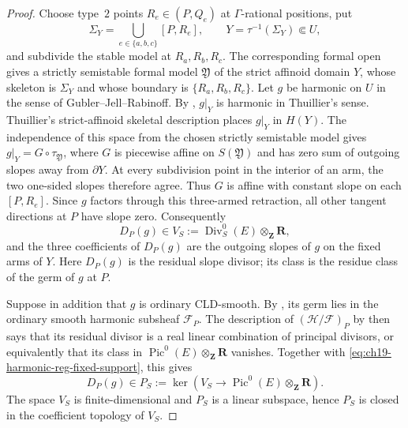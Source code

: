 \begin{proof}
Choose type~$2$ points $R_e\in(P,Q_e)$ at $\Gamma$-rational positions, put
\[
              \Sigma_Y=\bigcup_{e\in\{a,b,c\}}[P,R_e],
              \qquad Y=\tau^{-1}(\Sigma_Y)\Subset U,
\]
and subdivide the stable model at $R_a,R_b,R_c$.  The corresponding formal
open gives a strictly semistable formal model $\mathfrak Y$ of the strict
affinoid domain $Y$, whose skeleton is $\Sigma_Y$ and whose boundary is
$\{R_a,R_b,R_c\}$.  Let $g$ be harmonic on $U$ in the sense of
Gubler--Jell--Rabinoff.  By \cite[Proposition~15.7]{GJR26}, $g|_Y$ is
harmonic in Thuillier's sense.  Thuillier's strict-affinoid skeletal
description \cite[Definitions~2.3.1, 2.3.12, and 2.3.16]{Thu05} places
$g|_Y$ in $H(Y)$.  The independence of this space from the chosen strictly
semistable model \cite[Proposition~2.3.3]{Thu05} gives
$g|_Y=G\circ\tau_{\mathfrak Y}$, where $G$ is piecewise affine on
$S(\mathfrak Y)$ and has zero sum of outgoing slopes away from $\partial Y$.
At every subdivision point in the interior of an arm, the two one-sided
slopes therefore agree.  Thus $G$ is affine with constant slope on each
$[P,R_e]$.  Since $g$ factors through this three-armed retraction, all other
tangent directions at $P$ have slope zero.  Consequently
\begin{equation}
\label{eq:ch19-harmonic-reg-fixed-support}
       D_P(g)\in
       V_S:=\operatorname{Div}^0_S(E)\otimes_{\mathbf Z}\mathbf R,
\end{equation}
and the three coefficients of $D_P(g)$ are the outgoing slopes of $g$ on the
fixed arms of $Y$.  Here $D_P(g)$ is the residual slope divisor; its class is
the residue class of the germ of $g$ at $P$.

Suppose in addition that $g$ is ordinary CLD-smooth.  By
\cite[Remark~15.10]{GJR26}, its germ lies in the ordinary smooth harmonic
subsheaf $\mathcal F_P$.  The description of
$(\mathcal H/\mathcal F)_P$ by \cite[Lemma~2.3.22]{Thu05} then says that its
residual divisor is a real linear combination of principal divisors, or
equivalently that its class in
$\operatorname{Pic}^0(E)\otimes_{\mathbf Z}\mathbf R$ vanishes.  Together
with \eqref{eq:ch19-harmonic-reg-fixed-support}, this gives
\begin{equation}
\label{eq:ch19-harmonic-reg-picard-kernel}
 D_P(g)\in
 P_S:=\ker\!\left(
 V_S\longrightarrow\operatorname{Pic}^0(E)\otimes_{\mathbf Z}\mathbf R
 \right).
\end{equation}
The space $V_S$ is finite-dimensional and $P_S$ is a linear subspace, hence
$P_S$ is closed in the coefficient topology of $V_S$.


\end{proof}
